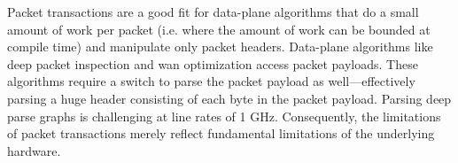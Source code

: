 Packet transactions are a good fit for data-plane algorithms that do a
small amount of work per packet (i.e. where the amount of work can be
bounded at compile time) and manipulate only packet
headers. Data-plane algorithms like deep packet inspection and wan
optimization access packet payloads. These algorithms require a switch
to parse the packet payload as well---effectively parsing a huge
header consisting of each byte in the packet payload. Parsing deep
parse graphs is challenging at line rates of 1 GHz.  Consequently, the limitations of packet
transactions merely reflect fundamental limitations of the underlying
hardware.




